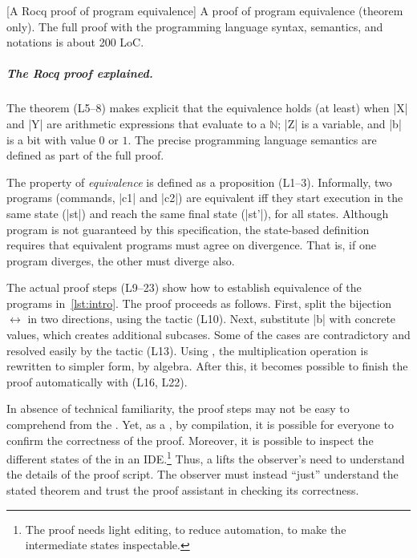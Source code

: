 \begin{center}
\captionsetup{type=lstlisting}
[A Rocq proof of program equivalence]{
A  proof of program equivalence (theorem only).
The full proof with the programming language syntax, semantics, and notations is
about 200 LoC.\footnotemark}
\label{lst:eq-proof}
\end{center}%

\subparagraph*{The Rocq proof explained.}
The  theorem (L5--8) makes explicit that the equivalence holds (at
least) when \pr|X| and \pr|Y| are arithmetic expressions that evaluate to a
\(\mathbb{N}\); \pr|Z| is a variable, and \pr|b| is a bit with value \(0\) or
\(1\). The precise programming language semantics are defined as part of the
full  proof.

The property of \emph{equivalence} is defined as a proposition (L1--3).
Informally, two programs (commands, \pr|c1| and \pr|c2|) are equivalent iff they
start execution in the same state (\pr|st|) and reach the same final state
(\pr|st'|), for all states. Although program  is not guaranteed
by this specification, the state-based definition requires that equivalent
programs must agree on divergence. That is, if one program diverges, the other
must diverge also.

The actual proof steps (L9--23) show how to establish equivalence of the
programs in~\autoref{lst:intro}. The proof proceeds as follows. First, split the
bijection \(\leftrightarrow\) in two directions, using the  tactic
(L10). Next, substitute \pr|b| with concrete values, which creates additional
subcases. Some of the cases are contradictory and resolved easily by the
 tactic (L13). Using , the multiplication
operation is rewritten to simpler form, by algebra. After this, it becomes
possible to finish the proof automatically with  (L16, L22).

In absence of technical familiarity, the proof steps may not be easy to
comprehend from the . Yet, as a , by
compilation, it is possible for everyone to confirm the correctness of the
proof. Moreover, it is possible to inspect the different states of the
 in an IDE.\footnote{The proof needs light editing, to reduce
automation, to make the intermediate states inspectable.} Thus, a
 lifts the observer's need to understand the details of
the proof script. The observer must instead \enquote{just} understand the
stated theorem and trust the proof assistant in checking its correctness.

